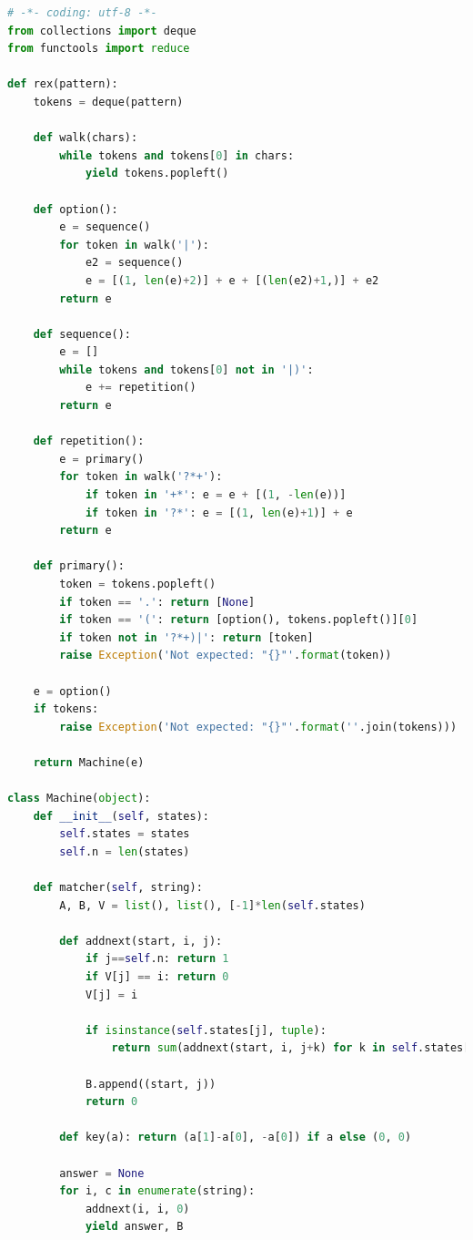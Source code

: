 \documentclass[a4paper,12pt,oneside,onecolumn]{uerj}
\begin{document}
\begin{lstlisting}[language=python]
# -*- coding: utf-8 -*-
from collections import deque
from functools import reduce

def rex(pattern):
    tokens = deque(pattern)

    def walk(chars):
        while tokens and tokens[0] in chars:
            yield tokens.popleft()

    def option():
        e = sequence()
        for token in walk('|'):
            e2 = sequence()
            e = [(1, len(e)+2)] + e + [(len(e2)+1,)] + e2
        return e        

    def sequence():
        e = []
        while tokens and tokens[0] not in '|)':
            e += repetition()
        return e
        
    def repetition():
        e = primary()
        for token in walk('?*+'):
            if token in '+*': e = e + [(1, -len(e))]
            if token in '?*': e = [(1, len(e)+1)] + e
        return e
        
    def primary():
        token = tokens.popleft()
        if token == '.': return [None]
        if token == '(': return [option(), tokens.popleft()][0]
        if token not in '?*+)|': return [token]
        raise Exception('Not expected: "{}"'.format(token))

    e = option()
    if tokens: 
        raise Exception('Not expected: "{}"'.format(''.join(tokens)))

    return Machine(e)
                
class Machine(object):
    def __init__(self, states):
        self.states = states
        self.n = len(states)
        
    def matcher(self, string):
        A, B, V = list(), list(), [-1]*len(self.states)
            
        def addnext(start, i, j):
            if j==self.n: return 1
            if V[j] == i: return 0
            V[j] = i

            if isinstance(self.states[j], tuple):
                return sum(addnext(start, i, j+k) for k in self.states[j])

            B.append((start, j))
            return 0
        
        def key(a): return (a[1]-a[0], -a[0]) if a else (0, 0)
        
        answer = None
        for i, c in enumerate(string):
            addnext(i, i, 0)
            yield answer, B
            

\end{lstlisting}
\end{document}
